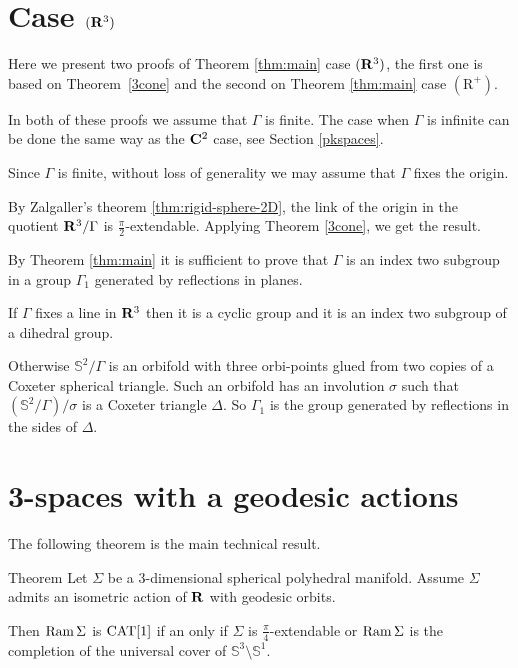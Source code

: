 \documentclass{compositio}
\begin{document}
\section{Case $(\mathbf{R}^3)$}\label{3R}

Here we present two proofs of Theorem \ref{thm:main} case $(\mathbf{R}^3)$, 
the first one is based on Theorem~\ref{3cone} and the second 
on Theorem \ref{thm:main} case $(\mathrm{R}^+)$.

In both of these proofs we assume that $\Gamma$ is finite.
The case when $\Gamma$ is infinite can be done the same way as the $\mathbf{C}^2$ case,
see Section \ref{pkspaces}.


Since $\Gamma$ is finite, 
without loss of generality we may assume that $\Gamma$ fixes the origin.

By Zalgaller's theorem \ref{thm:rigid-sphere-2D}, the link of the origin in the 
quotient $\mathbf{R}^3/\Gamma$ is $\tfrac\pi2$-extendable.
Applying Theorem \ref{3cone}, we get the result.
\qeds

By Theorem \ref{thm:main}
it is sufficient to prove that
$\Gamma$ is an index two subgroup in a group $\Gamma_1$ generated by reflections in planes.

If $\Gamma$ fixes a line in $\mathbf{R}^3$ then it is a cyclic group and it is an index two subgroup of
a dihedral group.

Otherwise $\mathbb{S}^2/\Gamma$ is an orbifold with three orbi-points glued
from two copies of a Coxeter spherical triangle.
Such an orbifold has an involution
$\sigma$ such that $(\mathbb{S}^2/\Gamma)/\sigma$ is a Coxeter triangle $\Delta$. So $\Gamma_1$
is the group generated by reflections in the sides of $\Delta$.
\qeds


\section{3-spaces with a geodesic actions}

The following theorem is the main technical result.

\begin{thm}{Theorem}\label{thm:3D-sphere}
Let $\Sigma$ be a 3-dimensional spherical polyhedral manifold.
Assume $\Sigma$ admits an isometric action of $\mathbf{R}$ with geodesic orbits.

Then $\mathop{\rm Ram}\nolimits\Sigma$ is $\mathrm{CAT}[1]$ if an only if  $\Sigma$ is $\frac\pi4$-extendable
or $\mathop{\rm Ram}\nolimits\Sigma$ is the completion of the universal cover of $\mathbb{S}^3\setminus \mathbb{S}^1$.
\end{thm}
\end{document}
